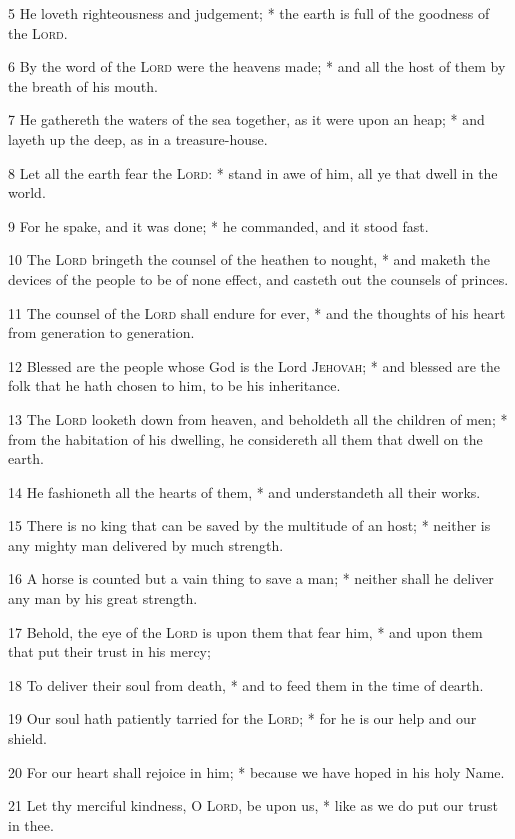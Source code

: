 5 He loveth righteousness and judgement; * the earth is full of the goodness of the {\textsc{Lord}}.\par
6 By the word of the {\textsc{Lord}} were the heavens made; * and all the host of them by the breath of his mouth.\par
7 He gathereth the waters of the sea together, as it were upon an heap; * and layeth up the deep, as in a treasure-house.\par
8 Let all the earth fear the {\textsc{Lord}}: * stand in awe of him, all ye that dwell in the world.\par
9 For he spake, and it was done; * he commanded, and it stood fast.\par
10 The {\textsc{Lord}} bringeth the counsel of the heathen to nought, * and maketh the devices of the people to be of none effect, and casteth out the counsels of princes.\par
11 The counsel of the {\textsc{Lord}} shall endure for ever, * and the thoughts of his heart from generation to generation.\par
12 Blessed are the people whose God is the Lord \textsc{Jehovah}; * and blessed are the folk that he hath chosen to him, to be his inheritance.\par
13 The {\textsc{Lord}} looketh down from heaven, and beholdeth all the children of men; * from the habitation of his dwelling, he considereth all them that dwell on the earth.\par
14 He fashioneth all the hearts of them, * and understandeth all their works.\par
15 There is no king that can be saved by the multitude of an host; * neither is any mighty man delivered by much strength.\par
16 A horse is counted but a vain thing to save a man; * neither shall he deliver any man by his great strength.\par
17 Behold, the eye of the {\textsc{Lord}} is upon them that fear him, * and upon them that put their trust in his mercy;\par
18 To deliver their soul from death, * and to feed them in the time of dearth.\par
19 Our soul hath patiently tarried for the {\textsc{Lord}}; * for he is our help and our shield.\par
20 For our heart shall rejoice in him; * because we have hoped in his holy Name.\par
21 Let thy merciful kindness, O {\textsc{Lord}}, be upon us, * like as we do put our trust in thee.
